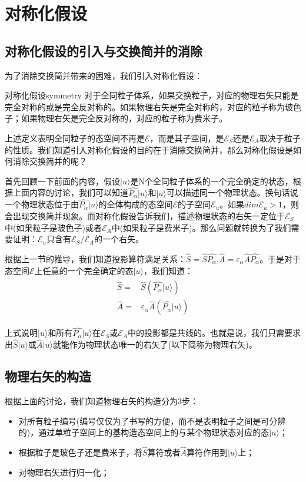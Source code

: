 \section{对称化假设}
    \subsection{对称化假设的引入与交换简并的消除}
    为了消除交换简并带来的困难，我们引入对称化假设：
    \begin{definition}{对称化假设}{symmetry}
        对于全同粒子体系，如果交换粒子，对应的物理右矢只能是完全对称的或是完全反对称的。如果物理右矢是完全对称的，对应的粒子称为玻色子；如果物理右矢是完全反对称的，对应的粒子称为费米子。
    \end{definition}
    
    上述定义表明全同粒子的态空间不再是$\mathscr{E}$，而是其子空间，是$\mathscr{E}_S$还是$\mathscr{E}_A$取决于粒子的性质。我们知道引入对称化假设的目的在于消除交换简并，那么对称化假设是如何消除交换简并的呢？
    
    首先回顾一下前面的内容，假设$|u\rangle$是N个全同粒子体系的一个完全确定的状态，根据上面内容的讨论，我们可以知道$\hat{P_\alpha}|u\rangle$和$|u\rangle$可以描述同一个物理状态。换句话说一个物理状态位于由$\hat{P_\alpha}|u\rangle$的全体构成的态空间$\mathscr{E}$的子空间$\mathscr{E}_u$。如果$dim\mathscr{E}_u>1$，则会出现交换简并现象。而对称化假设告诉我们，描述物理状态的右矢一定位于$\mathscr{E}_S$中(如果粒子是玻色子)或者$\mathscr{E}_A$中(如果粒子是费米子)。那么问题就转换为了我们需要证明：$\mathscr{E}_u$只含有$\mathscr{E}_S/\mathscr{E}_A$的一个右矢。
    
    根据上一节的推导，我们知道投影算符满足关系：$\hat{S}=\hat{S}\hat{P_\alpha}$,$\hat{A}=\varepsilon_\alpha\hat{A}\hat{P_\alpha}$。于是对于态空间$\mathscr{E}$上任意的一个完全确定的态$|u\rangle$，我们知道：
    \begin{align}
        \begin{split}
            \hat{S}=&\hat{S}(\hat{P_\alpha}|u\rangle)\\
            \hat{A}=&\varepsilon_\alpha\hat{A}(\hat{P_\alpha}|u\rangle)
        \end{split}
    \end{align}
    
    上式说明$|u\rangle$和所有$\hat{P_\alpha}|u\rangle$在$\mathscr{E}_S$或$\mathscr{E}_A$中的投影都是共线的。也就是说，我们只需要求出$\hat{S}|u\rangle$或$\hat{A}|u\rangle$就能作为物理状态唯一的右矢了(以下简称为物理右矢)。
    \subsection{物理右矢的构造}\label{subsection:physicalket}
    根据上面的讨论，我们知道物理右矢的构造分为3步：
    \begin{itemize}
        \item 对所有粒子编号(编号仅仅为了书写的方便，而不是表明粒子之间是可分辨的)，通过单粒子空间上的基构造态空间上的与某个物理状态对应的态$|u\rangle$；
        \item 根据粒子是玻色子还是费米子，将$\hat{S}$算符或者$\hat{A}$算符作用到$|u\rangle$上；
        \item 对物理右矢进行归一化；
    \end{itemize}
    
